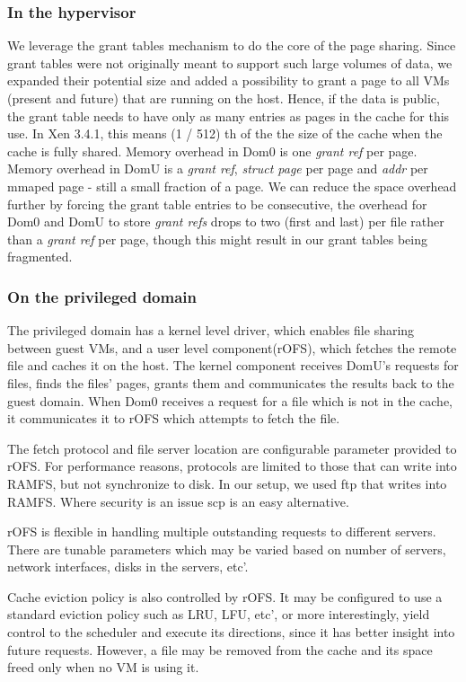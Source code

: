 \subsubsection{In the hypervisor}
We leverage the grant tables mechanism to do the core of the page sharing. Since grant tables were not originally meant to support such large volumes of data, we expanded their potential size and added a possibility to grant a page to all VMs (present and future) that are running on the host.
Hence, if the data is public, the grant table needs to have only as many entries as pages in the cache for this use. In Xen 3.4.1, this means (1 / 512) th of the the size of the cache when the cache is fully shared.
Memory overhead in Dom0 is one \textit{grant ref} per page. Memory overhead in DomU is a \textit{grant ref}, \textit{struct page} per page and \textit{addr} per mmaped page - still a small fraction of a page. We can reduce the space overhead further by forcing the grant table entries to be consecutive, the overhead for Dom0 and DomU to store \textit{grant refs} drops to two (first and last) per file rather than a \textit{grant ref} per page, though this might result in our grant tables being fragmented.

\subsubsection{On the privileged domain}
The privileged domain has a kernel level driver, which enables file sharing between guest VMs, and a user level component(rOFS), which fetches the remote file and caches it on the host. 
The kernel component receives DomU's requests for files, finds the files' pages, grants them and communicates the results back to the guest domain.
When Dom0 receives a request for a file which is not in the cache, it communicates it to rOFS which attempts to fetch the file. 

The fetch protocol and file server location are configurable parameter provided to rOFS. For performance reasons, protocols are limited to those that can write into RAMFS, but not synchronize to disk. In our setup, we used ftp that writes into RAMFS. Where security is an issue scp is an easy alternative.

rOFS is flexible in handling multiple outstanding requests to different servers. There are tunable parameters which may be varied based on number of servers, network interfaces, disks in the servers, etc'. 

Cache eviction policy is also controlled by rOFS. It may be configured to use a standard eviction policy such as LRU, LFU, etc', or more interestingly, yield control to the scheduler and execute its directions, since it has better insight into future requests. However, a file may be removed from the cache and its space freed only when no VM is using it.

